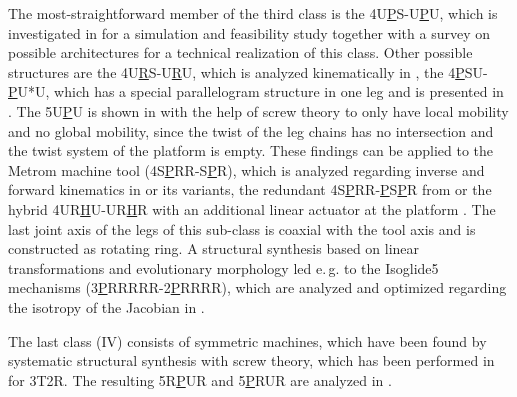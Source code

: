 \documentclass[robotics,article,submit,moreauthors,pdftex]{Definitions/mdpi}
\begin{document}
The most-straightforward member of the third class is the 4U\underline{P}S-U\underline{P}U, which is investigated in \cite{MbarekNefCor2005} for a simulation and feasibility study together with a survey on possible architectures for a technical realization of this class.
Other possible structures are the 4U\underline{R}S-U\underline{R}U, which is analyzed kinematically in \cite{SchreiberGos2003}, the 4\underline{P}SU-\underline{P}U*U, which has a special parallelogram structure in one leg and is presented in \cite{GaoPenZhaLi2006}.
The 5U\underline{P}U is shown in \cite{HuangLi2002} with the help of screw theory to only have local mobility and no global mobility, since the twist of the leg chains has no intersection and the twist system of the platform is empty.
These findings can be applied to the Metrom machine tool (4S\underline{P}RR-S\underline{P}R), which is analyzed regarding inverse and forward kinematics in \cite{BaerWei2006} or its variants, the redundant 4S\underline{P}RR-\underline{P}S\underline{P}R from \cite{AlaghebandMahMilBen2015} or the hybrid 4UR\underline{H}U-UR\underline{H}R with an additional linear actuator at the platform \cite{LinLiYanZha2013}.
The last joint axis of the legs of this sub-class \cite{BaerWei2006,LinLiYanZha2013,AlaghebandMahMilBen2015} is coaxial with the tool axis and is constructed as rotating ring.
A structural synthesis based on linear transformations and evolutionary morphology \cite{Gogu2008} led e.\,g. to the Isoglide5 mechanisms (3\underline{P}RRRRR-2\underline{P}RRRR), which are analyzed and optimized regarding the isotropy of the Jacobian in \cite{Gogu2006}.

The last class (IV) consists of symmetric machines, which have been found by systematic structural synthesis with screw theory, which has been performed in \cite{KongGos2005} for 3T2R.
The resulting 5R\underline{P}UR and 5\underline{P}RUR are analyzed in \cite{Tale-MasoulehGos2011,Tale-MasoulehSaaGosTag2010}.
\end{document}
